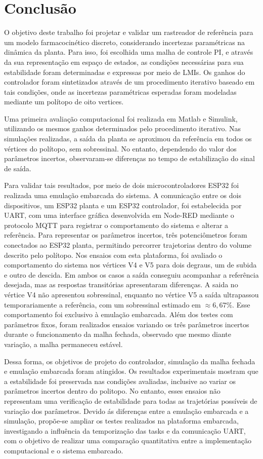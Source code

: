 \newpage
\section{Conclusão}
\label{sec:conclusao}

O objetivo deste trabalho foi projetar e validar um rastreador de referência para um modelo farmacocinético discreto, considerando incertezas paramétricas na dinâmica da planta. Para isso, foi escolhida uma malha de controle PI, e através da sua representação em espaço de estados, as condições necessárias para sua estabilidade foram determinadas e expressas por meio de LMIs. Os ganhos do controlador foram sintetizados através de um procedimento iterativo baseado em tais condições, onde as incertezas paramétricas esperadas foram modeladas mediante um polítopo de oito vertices.

Uma primeira avaliação computacional foi realizada em Matlab e Simulink, utilizando os mesmos ganhos determinados pelo procedimento iterativo. Nas simulações realizadas, a saída da planta se aproximou da referência em todos os vértices do polítopo, sem sobressinal. No entanto, dependendo do valor dos parâmetros incertos, observaram-se diferenças no tempo de estabilização do sinal de saída.

Para validar tais resultados, por meio de dois microcontroladores ESP32 foi realizada uma emulação embarcada do sistema. A comunicação entre os dois dispositivos, um ESP32 planta e um ESP32 controlador, foi estabelecida por UART, com uma interface gráfica desenvolvida em Node-RED mediante o protocolo MQTT  para registrar o comportamento do sistema e alterar a referência. Para representar os parâmetros incertos, três potenciômetros foram conectados ao ESP32 planta, permitindo percorrer trajetorias dentro do volume descrito pelo polítopo. Nos ensaios com esta plataforma, foi avaliado o comportamento do sistema nos vértices V4 e V5 para dois degraus, um de subida e outro de descida. Em ambos os casos a saída conseguiu acompanhar a referência desejada, mas as respostas transitórias apresentaram diferenças. A saida no vértice V4 não apresentou sobressinal, enquanto no vértice V5 a saída ultrapassou temporariamente a referência, com um sobressinal estimado em $\approx6,67\%$. Esse comportamento foi exclusivo à emulação embarcada. Além dos testes com parâmetros fixos, foram realizados ensaios variando os três parâmetros incertos durante o funcionamento da malha fechada, observado que mesmo diante variação, a malha permaneceu estável.

Dessa forma, os objetivos de projeto do controlador, simulação da malha fechada e emulação embarcada foram atingidos. Os resultados experimentais mostram que a estabilidade foi preservada nas condições avaliadas, inclusive ao variar os parâmetros incertos dentro do politopo. No entanto, esses ensaios não representam uma verificação de estabilidade para todas as trajetórias possíveis de variação dos parâmetros. Devido ás diferenças entre a emulação embarcada e a simulação, propõe-se ampliar os testes realizados na plataforma embarcada, investigando a influência da temporização das tasks e da comunicação UART, com o objetivo de realizar uma comparação quantitativa entre a implementação computacional e o sistema embarcado.

